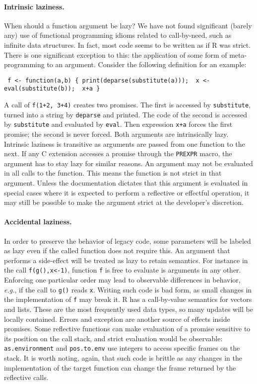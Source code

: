 \documentclass[review,nonacm,screen,acmsmall,anonymous=true]{acmart}
\newcommand{\code}[1]{\lstinline |#1|\xspace}
\renewcommand{\c}[1]{\lstinline |#1|\xspace}
\newcommand{\eg}{\emph{e.g.},\xspace}
\begin{document}
\paragraph{Intrinsic laziness.} When should a function argument be lazy?
We have not found significant (barely any) use of functional programming idioms
related to call-by-need, such as infinite data structures. In fact, most code
seems to be written as if R was strict. There is one significant exception to
this: the application of some form of meta-programming to an argument.
Consider the following definition for an example:
\begin{lstlisting}
 f <- function(a,b) { print(deparse(substitute(a)));  x <- eval(substitute(b));  x+a }
\end{lstlisting}

\medskip
\noindent
A call of \c{f(1+2, 3+4)} creates two promises. The first is accessed by
\c{substitute}, turned into a string by \c{deparse} and printed. The code of the
second is accessed by \c{substitute} and evaluated by \c{eval}. Then expression
\c{x+a} forces the first promise; the second is never forced. Both arguments are
intrinsically lazy. Intrinsic laziness is transitive as arguments are passed
from one function to the next. If any C extension accesses a promise through the
\code{PREXPR} macro, the argument has to stay lazy for similar reasons. An
argument may not be evaluated in all calls to the function. This means the
function is not strict in that argument. Unless the documentation dictates that
this argument is evaluated in special cases where it is expected to perform a
reflective or effectful operation, it may still be possible to make the argument
strict at the developer's discretion.

\paragraph{Accidental laziness.} In order to preserve the behavior of legacy
code, some parameters will be labeled as lazy even if the called function does
not require this. An argument that performs a side-effect will be treated as
lazy to retain semantics. For instance in the call \c{f(g(),x<-1)}, function \c
f is free to evaluate is arguments in any other. Enforcing one particular order
may lead to observable differences in behavior, \eg if the call to \c{g()} reads
\c{x}. Writing such code is bad form, as small changes in the implementation of
\c f may break it. R has a call-by-value semantics for vectors and lists. These
are the most frequently used data types, so many updates will be locally
contained. Errors and exception are another source of effects inside promises.
Some reflective functions can make evaluation of a promise sensitive to its
position on the call stack, and strict evaluation would be observable:
\code{as.environment} and \code{pos.to.env} use integers to access specific
frames on the stack. It is worth noting, again, that such code is brittle as any
changes in the implementation of the target function can change the frame
returned by the reflective calls.
\end{document}

